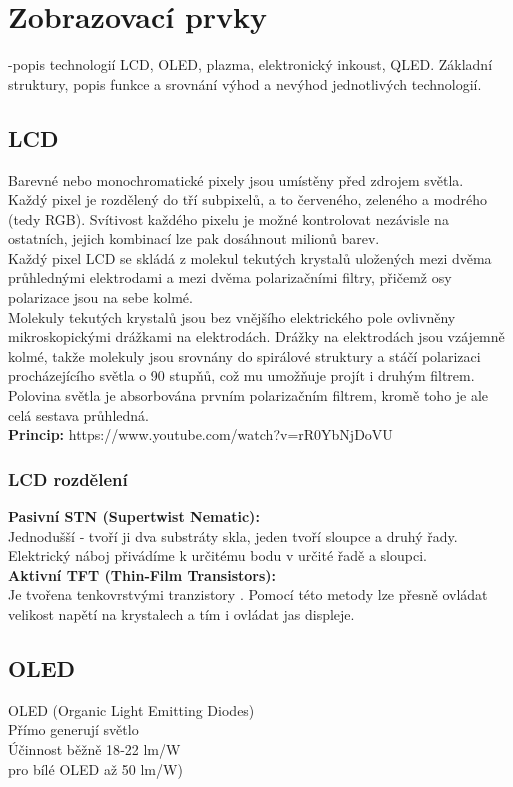 \section{Zobrazovací prvky}
-popis technologií LCD, OLED, plazma, elektronický inkoust, QLED. Základní struktury, popis funkce a srovnání výhod a nevýhod jednotlivých technologií.

\subsection{LCD}
Barevné nebo monochromatické pixely jsou umístěny před zdrojem
světla.\\
Každý pixel je rozdělený do tří subpixelů, a to červeného, zeleného a
modrého (tedy RGB). Svítivost každého pixelu je možné kontrolovat
nezávisle na ostatních, jejich kombinací lze pak
dosáhnout milionů barev.\\
Každý pixel LCD se skládá z molekul tekutých krystalů uložených mezi
dvěma průhlednými elektrodami a mezi dvěma polarizačními filtry,
přičemž osy polarizace jsou na sebe kolmé.\\
Molekuly tekutých krystalů jsou bez vnějšího elektrického pole ovlivněny
mikroskopickými drážkami na elektrodách. Drážky na elektrodách jsou
vzájemně kolmé, takže molekuly jsou srovnány do spirálové struktury a
stáčí polarizaci procházejícího světla o 90 stupňů, což mu umožňuje projít i
druhým filtrem.\\
Polovina světla je absorbována prvním polarizačním filtrem, kromě toho je
ale celá sestava průhledná.\\
\textbf{Princip:} https://www.youtube.com/watch?v=rR0YbNjDoVU
\subsubsection{LCD rozdělení}
\textbf{Pasivní STN (Supertwist Nematic):}\\
Jednodušší ‐ tvoří ji dva substráty skla, jeden tvoří sloupce a druhý řady.
Elektrický náboj přivádíme k určitému bodu v určité řadě a sloupci.\\
\textbf{Aktivní TFT (Thin‐Film Transistors):}\\
Je tvořena tenkovrstvými tranzistory . Pomocí této metody lze přesně ovládat
velikost napětí na krystalech a tím i ovládat jas displeje.\\

\subsection{OLED}
OLED (Organic Light Emitting Diodes)\\
Přímo generují světlo\\
Účinnost běžně 18‐22 lm/W\\
pro bílé OLED až 50 lm/W)\\

